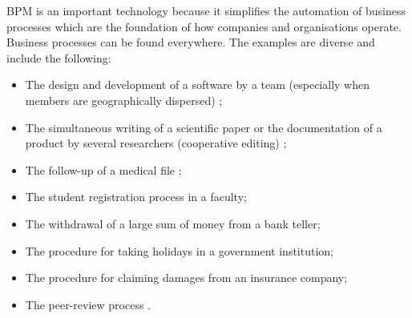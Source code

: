 \label{chap1:sec:running-example}
BPM is an important technology because it simplifies the automation of business processes which are the foundation of how companies and organisations operate. Business processes can be found everywhere. The examples are diverse and include the following:
\begin{itemize}
\item The design and development of a software by a team (especially when members are geographically dispersed) \cite{theseImine};
\item The simultaneous writing of a scientific paper or the documentation of a product by several researchers (cooperative editing) \cite{theseImine};
\item The follow-up of a medical file \cite{workflow07};
\item The student registration process in a faculty;
\item The withdrawal of a large sum of money from a bank teller;
\item The procedure for taking holidays in a government institution;
\item The procedure for claiming damages from an insurance company;
\item The peer-review process \cite{peerReview02, van2001proclets, badouel14}.
\end{itemize}

